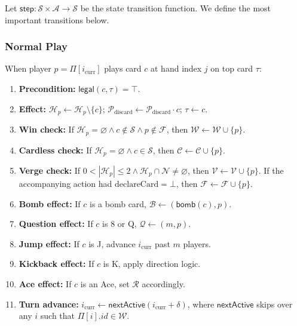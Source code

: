 \documentclass[11pt,a4paper,twoside]{article}
\theoremstyle{definition}
\theoremstyle{remark}
\newcommand{\Hand}{\ensuremath{\mathcal{H}}}
\newcommand{\Pile}{\ensuremath{\mathcal{P}}}
\newcommand{\State}{\ensuremath{\mathcal{S}}}
\newcommand{\Action}{\ensuremath{\mathcal{A}}}
\newcommand{\Top}{\ensuremath{\tau}}
\newcommand{\Dir}{\ensuremath{\delta}}
\newcommand{\Players}{\ensuremath{\Pi}}
\newcommand{\Winner}{\ensuremath{\mathcal{W}}}
\newcommand{\Cardless}{\ensuremath{\mathcal{C}}}
\newcommand{\Bomb}{\ensuremath{\mathcal{B}}}
\newcommand{\Quest}{\ensuremath{\mathcal{Q}}}
\newcommand{\OnVerge}{\ensuremath{\mathcal{V}}}
\newcommand{\Failed}{\ensuremath{\mathcal{F}}}
\newcommand{\CardReq}{\ensuremath{\mathcal{R}}}
\newcommand{\Special}{\ensuremath{\mathcal{S}}}
\newcommand{\Normal}{\ensuremath{\mathcal{N}}}
\newcommand{\func}[1]{\ensuremath{\mathsf{#1}}}
\begin{document}
Let $\func{step} : \State \times \Action \to \State$ be the state transition
function. We define the most important transitions below.

\subsubsection{Normal Play}

When player $p = \Players[i_{\text{curr}}]$ plays card $c$ at hand index
$j$ on top card $\Top$:

\begin{enumerate}[nosep]
  \item \textbf{Precondition:} $\func{legal}(c, \Top) = \top$.
  \item \textbf{Effect:}
        $\Hand_p \leftarrow \Hand_p \setminus \{c\}$;
        $\Pile_{\text{discard}} \leftarrow \Pile_{\text{discard}} \cdot c$;
        $\Top \leftarrow c$.
  \item \textbf{Win check:} If $\Hand_p = \varnothing \land c \notin \Special
        \land p \notin \Failed$, then $\Winner \leftarrow \Winner \cup \{p\}$.
  \item \textbf{Cardless check:} If $\Hand_p = \varnothing \land c \in \Special$,
        then $\Cardless \leftarrow \Cardless \cup \{p\}$.
  \item \textbf{Verge check:} If $0 < |\Hand_p| \leq 2 \land \Hand_p \cap \Normal
        \neq \varnothing$, then $\OnVerge \leftarrow \OnVerge \cup \{p\}$.
        If the accompanying action had $\text{declareCard} = \bot$, then
        $\Failed \leftarrow \Failed \cup \{p\}$.
  \item \textbf{Bomb effect:} If $c$ is a bomb card, $\Bomb \leftarrow
        (\func{bomb}(c), p)$.
  \item \textbf{Question effect:} If $c$ is 8 or Q, $\Quest \leftarrow (m, p)$.
  \item \textbf{Jump effect:} If $c$ is J, advance $i_{\text{curr}}$ past
        $m$ players.
  \item \textbf{Kickback effect:} If $c$ is K, apply direction logic.
  \item \textbf{Ace effect:} If $c$ is an Ace, set $\CardReq$ accordingly.
  \item \textbf{Turn advance:} $i_{\text{curr}} \leftarrow
        \func{nextActive}(i_{\text{curr}} + \Dir)$, where
        $\func{nextActive}$ skips over any $i$ such that
        $\Players[i].id \in \Winner$.
\end{enumerate}
\end{document}
